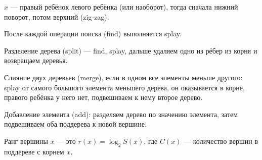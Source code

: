 \noindent
\begin{minipage}{\textwidth}
    $x$ --- правый ребёнок левого ребёнка (или наоборот),
    тогда сначала нижний поворот, потом верхний (zig-zag):

    \begin{center}
    \end{center}
\end{minipage}

После каждой операции поиска (find) выполняется splay.

Разделение дерева (split) --- find, splay,
дальше удаляем одно из рёбер из корня и возвращаем
деревья.

Слияние двух деревьев (merge),
если в одном все элементы меньше другого:
splay от самого большого элемента меньшего дерева,
он оказывается в корне, правого ребёнка у него нет,
подвешиваем к нему второе дерево.

Добавление элемента (add):
разделяем дерево по значению элемента,
затем подвешиваем оба поддерева к новой вершине.

\begin{definition}
    Ранг вершины $x$
    --- это $r(x) = \log_2 S(x)$,
    где $C(x)$ --- количество вершин в поддереве с корнем $x$.
\end{definition}

